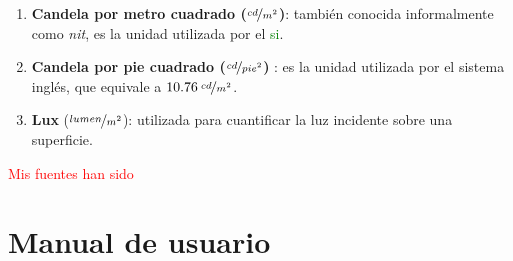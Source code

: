 \documentclass[a4paper, 12pt]{report}
\begin{document}
    
    
    
\begin{enumerate}
    \item \textbf{Candela por metro cuadrado {\footnotesize ($\nicefrac{cd}{m^{2}}$)}}: también conocida informalmente como \textit{nit}, es la unidad utilizada por el \textcolor{green}{si}.
    
    \item \textbf{Candela por pie cuadrado {\footnotesize ($\nicefrac{cd}{pie^{2}}$)}} : es la unidad utilizada por el     sistema inglés, que equivale a {\footnotesize $10.76\: \nicefrac{cd}{m^{2}}$}.

    
    \item \textbf{Lux} {\footnotesize ($\nicefrac{lumen}{m^{2}}$)}: utilizada para cuantificar la luz incidente sobre una superficie.
    
\end{enumerate}

\textcolor{red}{Mis fuentes han sido ~\cite{url:_vision_luz_color}}


\chapter{Manual de usuario}
\label{app:manual}
\end{document}
